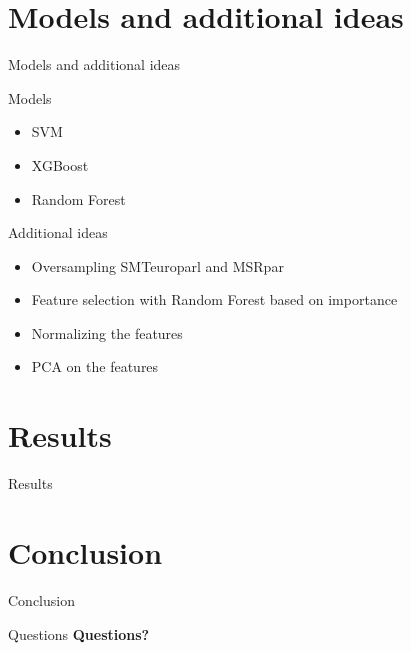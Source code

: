 \documentclass{beamer}
\begin{document}
\section{Models and additional ideas}
\begin{frame}{Models and additional ideas}
    \begin{block}{Models}
        \begin{itemize}
            \item SVM
            \item XGBoost
            \item Random Forest
        \end{itemize}
    \end{block}

    \begin{block}{Additional ideas}
        \begin{itemize}
            \item Oversampling SMTeuroparl and MSRpar
            \item Feature selection with Random Forest based on importance
            \item Normalizing the features
            \item PCA on the features
        \end{itemize}
    \end{block}
\end{frame}

\section{Results}

\begin{frame}{Results}
    
\end{frame}

\section{Conclusion}

\begin{frame}{Conclusion}
    \begin{itemize}
    \end{itemize}
\end{frame}

\begin{frame}{Questions}
    \centering
    {\Huge \textbf{Questions?}}
\end{frame}
\end{document}
